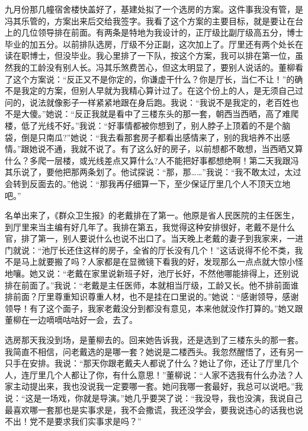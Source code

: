 \documentclass[12pt,oneside]{book}
\begin{document}
九月份那几幢宿舍楼快盖好了，基建处拟了一个选房的方案。这件事我没有管，是冯其乐管的，方案出来后交给我签字。我看了这个方案的主要目标，就是要让在台上的几位领导排在前面。有两条是特地为我设计的，正厅级比副厅级高五分，博士毕业的加五分。以前排队选房，厅级不分正副，这次加上了。厅里还有两个处长在读在职博士，但没毕业。我心里排了一下队，按这个方案，我可以排在第一位，虽然我的工龄没有别人长。冯其乐煞费苦心，但这太明显了，要别人说话的。董柳看了这个方案说：``反正又不是你定的，你谦虚干什么？你是厅长，当仁不让！''的确不是我定的方案，但别人早就为我精心算计过了。在这个份上的人，是无须自己过问的，说法就像影子一样紧紧地跟在身后跑。我说：``我说不是我定的，老百姓也不是大傻。''她说：``反正我就是看中了三楼东头的那一套，朝西当西晒，高了难爬楼，低了光线不好。''我说：``好事情都被你想到了，别人脖子上顶着的不是个脑袋，倒是只南瓜?''她说：``我去看那套房子都看出感情来了，别的我培养不出感情。''跟她说不通，我就不说了。有了这么好的房子，以前想都不敢想，当西晒又算什么？多爬一层楼，或光线差点又算什么?人不能把好事都想绝啊！第二天我跟冯其乐说了，要他把那两条划了。他试探说：``那，那\ldots\ldots{}''我说：``我不敢太过，太过会转到反面去的。''他说：``那我再仔细算一下，至少保证厅里几个人不顶天立地吧。''

名单出来了，《群众卫生报》的老戴排在了第一。他原是省人民医院的主任医生，到厅里来当主编有好几年了。我排在第五，我觉得这种安排很好，老戴不是什么官，排了第一，别人要说什么也说不出口了。当天晚上老戴的妻子到我家来，一进门就说：``池厅长还住这样的房子，全省的厅长没有几个！''这话说得不伦不类，我不是马上就要搬了吗？人家都是在显微镜下看我的好，发现那么一点点就大惊小怪地嚷。她又说：``老戴在家里说新班子好，池厅长好，不然他哪能排得上，还别说排在前面了。''我说：``老戴是主任医师，本就相当厅级，工龄又长。他不排前面谁排前面？厅里尊重知识尊重人材，也不是挂在口里说的。''她说：``感谢领导，感谢领导！有了这个面子，我家老戴没分到都没有意见，本来他就没作打算的。''她又跟董柳在一边嘀嘀咕咕好一会，去了。

选房那天我没到场，是董柳去的。回来她告诉我，还是选到了三楼东头的那一套。我简直不相信，问老戴选的是哪一套？她说是二楼西头。我忽然醒悟了，还有另一只手在安排。我说：``那天你跟老戴夫人都说了什么？她让了你，还让了厅里几个人，连厅里几个人都让了你，有什么意思！''董柳说：``人家不选我有什么办法？人家主动提出来，我也没说我一定要哪一套。她问我哪一套最好，我总可以说吧。''我说：``这是一场戏，你就是导演。''她几乎要哭了说：``我没导，我也没演，我说自己最喜欢哪一套那也是实事求是，我不会撒谎，我还没学会，要我说违心的话我也说不出！党不是要求我们实事求是吗？''
\end{document}
